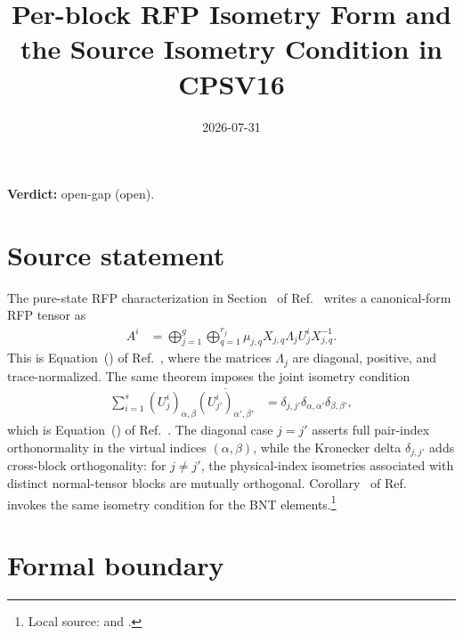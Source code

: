 \documentclass{article}
\title{Per-block RFP Isometry Form and the Source Isometry Condition in CPSV16}
\author{}
\date{2026-07-31}
\providecommand{\gapnote}[2]{%
    \par\noindent\textbf{Verdict:} #1 (#2).\par}
\begin{document}
\maketitle
\gapnote{open-gap}{open}

\section{Source statement}

The pure-state RFP characterization in Section~ of
Ref.~\cite{Cirac2016MPDO_arXiv} writes a canonical-form RFP tensor as
\begin{align}
    A^i
        &=
    \bigoplus_{j=1}^g\bigoplus_{q=1}^{r_j}
    \mu_{j,q}X_{j,q}\Lambda_jU_j^iX_{j,q}^{-1}.
    \label{eq:cpsv16_canonical_rfp_tensor}
\end{align}
This is Equation~() of Ref.~\cite{Cirac2016MPDO_arXiv},
where the matrices $\Lambda_j$ are diagonal, positive, and trace-normalized. The
same theorem imposes the joint isometry condition
\begin{align}
    \sum_{i=1}^s
    (U_j^i)_{\alpha,\beta}
    \overline{(U_{j'}^i)_{\alpha',\beta'}}
        &=
    \delta_{j,j'}\delta_{\alpha,\alpha'}\delta_{\beta,\beta'},
    \label{eq:cpsv16_source_joint_isometry}
\end{align}
which is Equation~() of
Ref.~\cite{Cirac2016MPDO_arXiv}. The diagonal case $j=j'$ asserts full
pair-index orthonormality in the virtual indices $(\alpha,\beta)$, while the
Kronecker delta $\delta_{j,j'}$ adds cross-block orthogonality: for $j\ne j'$,
the physical-index isometries associated with distinct normal-tensor blocks are
mutually orthogonal. Corollary~ of
Ref.~\cite{Cirac2016MPDO_arXiv} invokes the same isometry condition for the
BNT elements.\footnote{Local source:
 and
.}

\section{Formal boundary}
\end{document}
